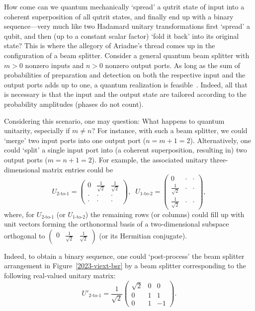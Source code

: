 \documentclass[%
 superscriptaddress,
  preprint,
 showpacs,
 showkeys,
 nofootinbib,
  amsmath,amssymb,
  aps,
 pra,
  longbibliography,
  floatfix,
 ]{revtex4-2}
\theoremstyle{definition}
\begin{document}
How come can we quantum mechanically `spread' a  qutrit state of input  into a coherent superposition of all qutrit states,
and finally end up with a binary sequence---very much like two Hadamard unitary transformations first `spread' a qubit,
and then (up to a constant scalar factor) `fold it back' into its original state?
This is where the allegory of Ariadne's thread comes up in the configuration of a beam splitter.
Consider a general quantum beam splitter with $m>0$ nonzero inputs and $n>0$ nonzero output ports.
As long as the sum of probabilities of preparation and detection on both the respective input and the output ports adds up to one,
a quantum realization is feasible~\cite{reck-94,rzbb,%
de_Guise_2018}. Indeed, all that is necessary
is that the input and the output state are tailored according to the probability amplitudes (phases do not count).

Considering this scenario, one may question:
What happens to quantum unitarity, especially if $m \neq n$?
For instance, with such a beam splitter, we could `merge' two input ports into one output port ($n=m+1=2$).
 Alternatively, one could `split' a single input port into (a coherent superposition, resulting in) two output ports ($m=n+1=2$).
For example, the associated unitary three-dimensional matrix entries could be
\begin{equation}
U_{\text{2-to-1}}=
\begin{pmatrix}
0&\frac{1}{\sqrt{2}}&\frac{1}{\sqrt{2}} \\
\cdot&\cdot&\cdot \\
\cdot&\cdot&\cdot
\end{pmatrix}
,\phantom{x}%
U_{\text{1-to-2}}=
\begin{pmatrix}
0&\cdot&\cdot \\
\frac{1}{\sqrt{2}}&\cdot&\cdot \\
\frac{1}{\sqrt{2}}&\cdot&\cdot
\end{pmatrix},
\end{equation}
where, for $U_{\text{2-to-1}}$ (or $U_{\text{1-to-2}}$)
the remaining rows (or columns) could fill up with unit vectors forming the orthonormal basis of a two-dimensional subspace orthogonal to
$
\begin{pmatrix}
0&\frac{1}{\sqrt{2}}&\frac{1}{\sqrt{2}}
\end{pmatrix}
$
(or its Hermitian conjugate).


Indeed, to obtain a binary sequence, one could `post-process' the beam splitter arrangement  in
Figure~\ref{2023-viext-bsr} by a beam splitter corresponding to the following real-valued unitary matrix:
\begin{equation}
%
U'_{\text{2-to-1}}=
\frac{1}{\sqrt{2}}
\begin{pmatrix}
\sqrt{2}&0&0\\
0&1&1 \\
0&1&-1
\end{pmatrix}
.
\label{2023-viext-ub1to}
\end{equation}
\end{document}
